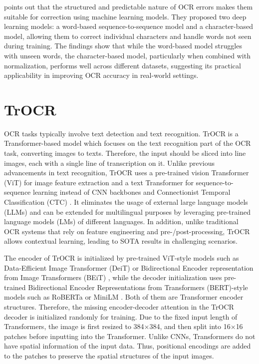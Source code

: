 \cite{mokhtar2018ocr} points out that the structured and predictable nature of OCR errors makes them suitable for correction using machine learning models. They proposed two deep learning models: a word-based sequence-to-sequence model and a character-based model, allowing them to correct individual characters and handle words not seen during training. The findings show that while the word-based model struggles with unseen words, the character-based model, particularly when combined with normalization, performs well across different datasets, suggesting its practical applicability in improving OCR accuracy in real-world settings.

\section{TrOCR}
\label{sec:2_trocr}
OCR tasks typically involve text detection and text recognition. TrOCR is a Transformer-based model which focuses on the text recognition part of the OCR task, converting images to texts. Therefore, the input should be sliced into line images, each with a single line of transcription on it. Unlike previous advancements in text recognition, TrOCR uses a pre-trained vision Transformer (ViT) \citep{dosovitskiy2020image} for image feature extraction and a text Transformer \citep{vaswani2017attention} for sequence-to-sequence learning instead of CNN backbones \citep{wang2020cspnet} and Connectionist Temporal Classification (CTC) \citep{graves2006connectionist}. It eliminates the usage of external large language models (LLMs) and can be extended for multilingual purposes by leveraging pre-trained language models (LMs) of different languages. In addition, unlike traditional OCR systems that rely on feature engineering and pre-/post-processing, TrOCR allows contextual learning, leading to SOTA results in challenging scenarios.

The encoder of TrOCR is initialized by pre-trained ViT-style models such as Data-Efficient Image Transformer (DeiT) \citep{touvron2021training} or Bidirectional Encoder representation from Image Transformers (BEiT) \citep{bao2021beit}, while the decoder initialization uses pre-trained Bidirectional Encoder Representations from Transformers (BERT)-style models such as RoBERTa \citep{liu2019roberta} or MiniLM \citep{wang2020minilm}. Both of them are Transformer encoder structures. Therefore, the missing encoder-decoder attention in the TrOCR decoder is initialized randomly for training. Due to the fixed input length of Transformers, the image is first resized to 384$\times$384, and then split into 16$\times$16 patches before inputting into the Transformer. Unlike CNNs, Transformers do not have spatial information of the input data. Thus, positional encodings are added to the patches to preserve the spatial structures of the input images.


